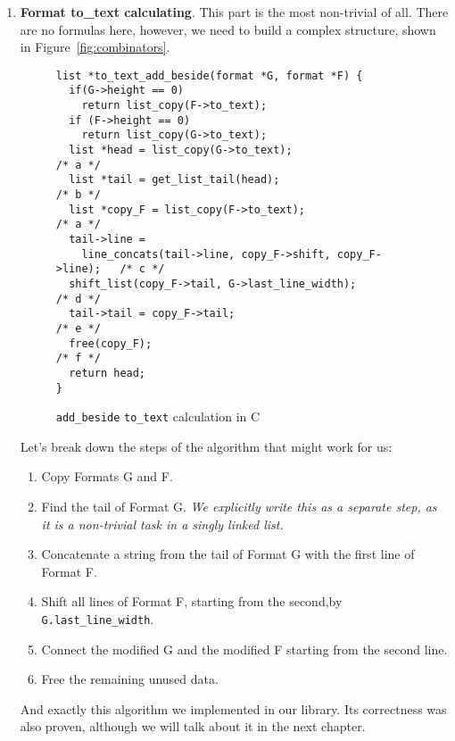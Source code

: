 \documentclass[14pt]{constructor-diploma}
\begin{document}
\begin{enumerate}
  \item \textbf{Format to\_text calculating}. This part is the most non-trivial of all. 
  There are no formulas here, however, we need to build a complex structure, shown in Figure~\ref{fig:combinators}. 

\begin{figure}[H]
\begin{mdframed}[backgroundcolor=bg]
\begin{verbatim}
list *to_text_add_beside(format *G, format *F) {
  if(G->height == 0)
    return list_copy(F->to_text);
  if (F->height == 0)
    return list_copy(G->to_text);
  list *head = list_copy(G->to_text);                        /* a */
  list *tail = get_list_tail(head);                          /* b */
  list *copy_F = list_copy(F->to_text);                      /* a */
  tail->line = 
    line_concats(tail->line, copy_F->shift, copy_F->line);   /* c */
  shift_list(copy_F->tail, G->last_line_width);              /* d */
  tail->tail = copy_F->tail;                                 /* e */
  free(copy_F);                                              /* f */
  return head;
}
\end{verbatim}
\end{mdframed}
\caption{\texttt{add\_beside} \texttt{to\_text} calculation in C}
\label{fig:to_text_calculation}
\end{figure}

  Let's break down the steps of the algorithm that might work for us:
  \begin{enumerate}
    \item Copy Formats G and F.
    \item Find the tail of Format G. \textit{We explicitly write this as a separate step, as it is a non-trivial task in a singly linked list.}
    \item Concatenate a string from the tail of Format G with the first line of Format F.
    \item Shift all lines of Format F, starting from the second,\newline by \texttt{G.last\_line\_width}.
    \item Connect the modified G and the modified F starting from the second line.
    \item Free the remaining unused data.
  \end{enumerate}
  And exactly this algorithm we implemented in our library. Its correctness was also proven, although we will talk about it in the next chapter.
\end{enumerate}
\end{document}
